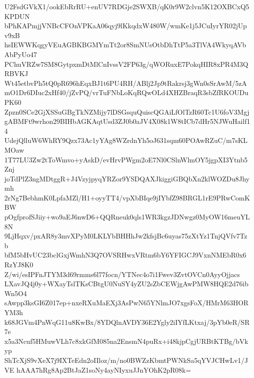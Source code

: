 U2FsdGVkX1/ookEbRrRU+enUV7RDGje2SWXB/qK0r9W2clvn5K12OXBCxQ5KPDUN
bPhKAPmjjVNBcCFOnVPKaA06qyj9lKkqdxW480W/wmKe1j5JCuIyrYR02jUpv9xB
hsIEWWKqgyVEuAGBKBGMYmTt2or8SmNUsOtbDhTtP5a3TlVA4WkyqAVbAbPyUo47
PChuVRZw7SM8GytpxmDtMlCnIvssV2FP63g/qWORuxE7PokqHIR8xPR4M3QRBVKJ
Wt45etbvPh5tQ0pR696hEqxBJ1t6PU4RH/ABlj2Jp9tRakrsj3gWn0sSrAwM/5zA
mO1Dr6DIuc2xHf40/jZvPQ/vrTuFNbLoKqRQwOLd4XHZBraqR3sbZfRKOUDuPK60
Zpzn0SCe2GjXSSuGBgTkNZMijy7lDSGsquQuiscQGAiLfOlTzR60Tc1U6foV3Mgj
gABMFt9wrhon29BIHbAGKAqtUsd3ZJ0b0aJV4X08k1W8tICb7dHr5NJWuHailf14
UdejQlluW6WhRY9Qzx73Ac1yYAg8WZrdnYh5oJ631sqm60POAwRZuC/m7sKLMOaw
1T77LU3Zw2tToWmvo+yAskD/evHrvPWgm2oE7Nl0CSlnWlmOY5jgpXI3Ytnb5Znj
joTdPlZ3ngMDtggR+J4VzyjpyqYRZor9YSDQAXJkiggiGBQbXn2klWOZDu8Jhymh
2rNg7BebhmK0LpfaMZl/H1+oyyTT4/vpXbBIqe9jIYbfZ98BRGL1rE9PRwComKBW
pOgfprofSJiiy+wo9aEJ6nwD6+QQRneuk0qls1WR3kgzJDNwgz0MyOW16meuYL8N
9LjHqxv/pxAR8y3mvXPyM0LKLYbBHHhJw2kfsjBc6uyas75zXtYz1TnjQVfv7Tzb
bfM5bHvUC23bclGxjWmhN3Q7OVSRHwxVRtm6bY6YFIGCJ9VxnNMEbR0x6RzYJ8K0
Z/wi/esIPFnJTYM3d69rmms6l77focn/YTNec4o7i1Fwev3ZvtOVCn0AyyOjjacs
LXavJQ4j0y+WXayTslTKsCBtgU0NuSY4yZU2sZbCEWjgAwPMW8HQE2d76ibWn5O4
sAwpp3ksGI6Z017ep+nxeRXuMaEXj3AsPwN65YNlmJO7xgsFoX/HMrM63HORYM3h
k68JGVm4PnWqG11u8KwBx/8YDQlnAVDY36E2Ygly2iIYfLKtxaj/3pYb0eR/SR7e
x5a3Ncuf5HMuwVLh7c8xkGfM085na2EnsmN4puRx+i48kjpCgjURBtKTBg/bVkyp
ShTcXjS9vXeX7j9IXTeEdn2oIIloz/m/no0BWZzKbmtPWNkSa5qYVJCHwLv1/JVE
hAAA7hRg8Ap2BtJaZ1soNy4ayNIyxuJJnYOhK2pR08k=
